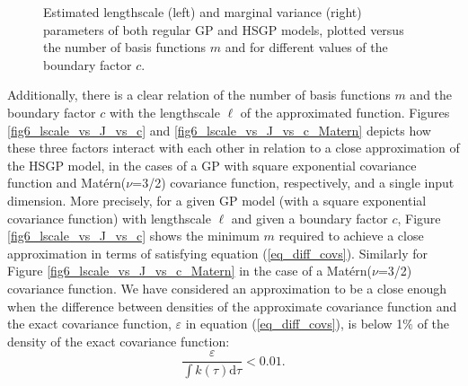 \documentclass[onecolumn,a4paper,11pt]{article}
\begin{document}
\begin{figure}
\caption{Estimated lengthscale (left) and marginal variance (right) parameters of both regular GP and HSGP models, plotted versus the number of basis functions $m$ and for different values of the boundary factor $c$.}
  \label{fig5_lscale_vs_J}
\end{figure}


Additionally, there is a clear relation of the number of basis functions $m$ and the boundary factor $c$ with the lengthscale $\ell$ of the approximated function. Figures \ref{fig6_lscale_vs_J_vs_c} and \ref{fig6_lscale_vs_J_vs_c_Matern} depicts how these three factors interact with each other in relation to a close approximation of the HSGP model, in the cases of a GP with square exponential covariance function and Mat\'ern($\nu$=3/2) covariance function, respectively, and a single input dimension. More precisely, for a given GP model (with a square exponential covariance function) with lengthscale $\ell$ and given a boundary factor $c$, Figure \ref{fig6_lscale_vs_J_vs_c} shows the minimum $m$ required to achieve a close approximation in terms of satisfying equation (\ref{eq_diff_covs}). Similarly for Figure \ref{fig6_lscale_vs_J_vs_c_Matern} in the case of a Mat\'ern($\nu$=3/2) covariance function. We have considered an approximation to be a close enough when the difference between densities of the approximate covariance function and the exact covariance function, $\varepsilon$ in equation (\ref{eq_diff_covs}), is below 1$\%$ of the density of the exact covariance function:
%
\begin{equation*}
 \frac{\varepsilon}{\int k(\tau) \mathrm{d}\tau} < 0.01.
\end{equation*}
\end{document}

